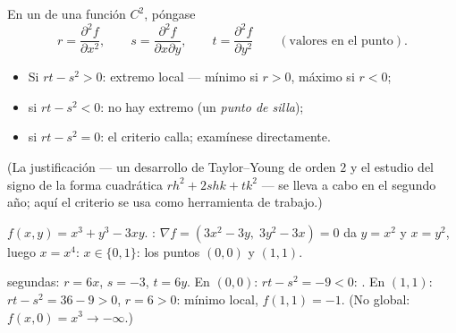 \begin{method}\label{met:b1:multivar:monge}
En un  de una función $C^2$, póngase
\[
r = \frac{\partial^2 f}{\partial x^2},
\qquad
s = \frac{\partial^2 f}{\partial x \partial y},
\qquad
t = \frac{\partial^2 f}{\partial y^2}
\qquad (\text{valores en el punto}).
\]
\begin{itemize}
  \item Si $rt - s^2 > 0$: extremo local --- mínimo si $r > 0$,
        máximo si $r < 0$;
  \item si $rt - s^2 < 0$: no hay extremo (un \emph{punto de
        silla});
  \item si $rt - s^2 = 0$: el criterio calla; examínese directamente.
\end{itemize}
(La justificación --- un desarrollo de Taylor--Young de orden $2$ y el
estudio del signo de la forma cuadrática $r h^2 + 2shk + tk^2$ --- se
lleva a cabo en el segundo año; aquí el criterio se usa como
herramienta de trabajo.)
\end{method}

\begin{example}\label{ex:b1:multivar:extrema}
$f(x,y) = x^3 + y^3 - 3xy$. : $\nabla f = (3x^2 -
3y,\; 3y^2 - 3x) = 0$ da $y = x^2$ y $x = y^2$, luego $x = x^4$:
$x \in \{0, 1\}$: los puntos $(0,0)$ y $(1,1)$.

 segundas: $r = 6x$, $s = -3$, $t = 6y$. En $(0,0)$: $rt -
s^2 = -9 < 0$: . En $(1,1)$: $rt - s^2 = 36 - 9 > 0$, $r = 6
> 0$: mínimo local, $f(1,1) = -1$. (No global: $f(x, 0) = x^3 \to
-\infty$.)
\end{example}

